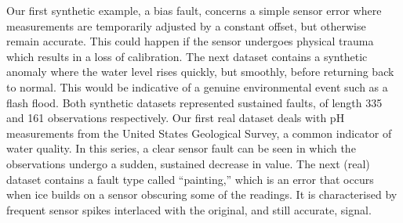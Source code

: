 \documentclass{article} %
\begin{document}
Our first synthetic example, a bias fault, concerns a simple sensor
error where measurements are temporarily adjusted by a constant
offset, but otherwise remain accurate. This could happen if the sensor
undergoes physical trauma which results in a loss of calibration.
The next dataset contains a synthetic anomaly where the water level
rises quickly, but smoothly, before returning back to normal. This
would be indicative of a genuine environmental event such as a flash
flood. Both synthetic datasets represented sustained faults, of length 335 and 161 observations respectively.
Our first real dataset deals with pH measurements from the United States Geological Survey, a common indicator of water quality. In this series, a clear sensor fault can be seen
in which the observations undergo a sudden, sustained decrease in value.
The next (real) dataset contains a fault type called ``painting,'' which is
an error that occurs when ice builds on a sensor obscuring some of the
readings. It is characterised by frequent sensor spikes interlaced
with the original, and still accurate, signal.

\end{document}
